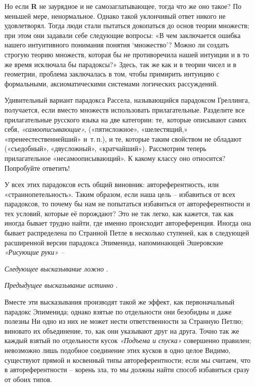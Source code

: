 \documentclass[../main.tex]{subfiles}
\begin{document}
Но если \textbf{R} не заурядное и не самозаглатывающее, тогда что же оно такое? По меньшей мере, ненормальное. Однако такой уклончивый ответ никого не удовлетворял. Тогда люди стали пытаться докопаться до основ теории множеств; при этом они задавали себе следующие вопросы: «В чем заключается ошибка нашего интуитивного понимания понятия \enquote*{множество}? Можно ли создать строгую теорию множеств, которая бы не противоречила нашей интуиции и в то же время исключала бы парадоксы?» Здесь, так же как и в теории чисел и в геометрии, проблема заключалась в том, чтобы примирить интуицию с формальными, аксиоматическими системами логических рассуждений.

Удивительный вариант парадокса Рассела, называющийся парадоксом Греллинга, получается, если вместо множеств использовать прилагательные. Разделите все прилагательные русского языка на две категории: те,~которые описывают самих себя, \emph{«самоописывающие»,} («пятисложное», «шелестящий,» «пренеестественнейший» и~т.\,п.), и те, которые таким свойством не обладают («съедобный», «двусложный», «кратчайший»). Рассмотрим теперь прилагательное «несамоописывающий». К какому классу оно относится? Попробуйте ответить!

У всех этих парадоксов есть общий виновник: автореферентность, или «страннопетельность». Таким образом, если наша цель \--- избавиться от всех парадоксов, то почему бы нам не попытаться избавиться от автореферентности и тех условий, которые её порождают? Это не так легко, как кажется, так как иногда бывает трудно найти, где именно происходит автореференция. Иногда она бывает распределена по Странной Петле в несколько ступеней, как в следующей расширенной версии парадокса Эпименида, напоминающей Эшеровские \emph{«Рисующие руки» \---}

\emph{Следующее высказывание ложно} .

\emph{Предыдущее высказывание истинно} .

Вместе эти высказывания производят такой же эффект, как первоначальный парадокс Эпименида; однако взятые по отдельности они безобидны и даже полезны Ни одно из них не может нести ответственности за Странную Петлю; виновато их объединение, то, как они указывают друг на друга. Точно так же каждый взятый по отдельности кусок \emph{«Подъема и спуска»} совершенно правилен; невозможно лишь подобное соединение этих кусков в одно целое Видимо, существуют прямой и косвенный типы автореферентности; если мы считаем, что в автореферентности \--- корень зла, то мы должны найти способ избавиться сразу от обоих типов.
\end{document}
